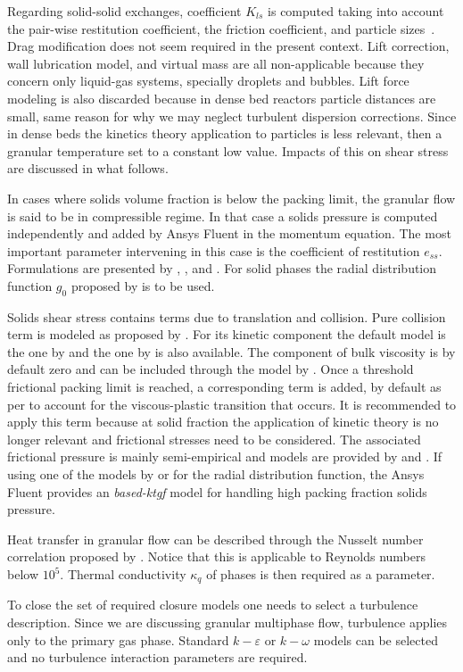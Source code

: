 Regarding solid-solid exchanges, coefficient $K_{ls}$ is computed taking into account the pair-wise restitution coefficient, the friction coefficient, and particle sizes~\cite{Syamlal1987b}. Drag modification does not seem required in the present context. Lift correction, wall lubrication model, and virtual mass are all non-applicable because they concern only liquid-gas systems, specially droplets and bubbles. Lift force modeling is also discarded because in dense bed reactors particle distances are small, same reason for why we may neglect turbulent dispersion corrections. Since in dense beds the kinetics theory application to particles is less relevant, then a granular temperature set to a constant low value. Impacts of this on shear stress are discussed in what follows.

In cases where solids volume fraction is below the packing limit, the granular flow is said to be in compressible regime. In that case a solids pressure is computed independently and added by Ansys Fluent in the momentum equation. The most important parameter intervening in this case is the coefficient of restitution $e_{ss}$. Formulations are presented by \textcite{Gidaspow1994}, \textcite{Syamlal1993}, and \textcite{Ahmadi1990}. For solid phases the radial distribution function $g_{0}$ proposed by \textcite{Gidaspow1994} is to be used.

Solids shear stress contains terms due to translation and collision. Pure collision term is modeled as proposed by \textcite{Gidaspow1992}. For its kinetic component the default model is the one by \textcite{Syamlal1993} and the one by \textcite{Gidaspow1992} is also available. The component of bulk viscosity  is by default zero and can be included through the model by \textcite{Lun1984}. Once a threshold frictional packing limit is reached, a corresponding term is added, by default as per \textcite{Schaeffer1987} to account for the viscous-plastic transition that occurs. It is recommended to apply this term because at solid fraction the application of kinetic theory is no longer relevant and frictional stresses need to be considered. The associated frictional pressure is mainly semi-empirical and models are provided by \textcite{Johnson1987} and \textcite{Syamlal1993}. If using one of the models by \textcite{Lun1984} or \textcite{Gidaspow1992} for the radial distribution function, the Ansys Fluent provides an \emph{based-ktgf} model for handling high packing fraction solids pressure.
 
Heat transfer in granular flow can be described through the Nusselt number correlation proposed by \textcite{Gunn1978}. Notice that this is applicable to Reynolds numbers below $10^5$. Thermal conductivity $\kappa_q$ of phases is then required as a parameter.

To close the set of required closure models one needs to select a turbulence description. Since we are discussing granular multiphase flow, turbulence applies only to the primary gas phase. Standard $k-\varepsilon$ or $k-\omega$ models can be selected and no turbulence interaction parameters are required.

\endinput